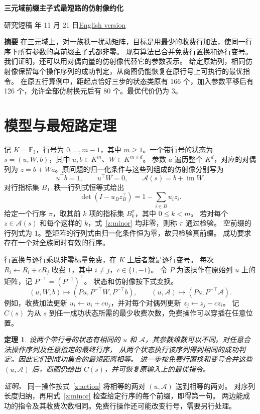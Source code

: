 \documentclass[UTF8,a4paper,11pt,scheme=plain]{ctexart}
\theoremstyle{zh}
\newtheorem{zhthm}{定理}
\theoremstyle{plain}
\newcommand{\F}{\mathbb F_3}
\newcommand{\A}{\mathcal A}
\newcommand{\im}{\operatorname{im}}
\newcommand{\stateeq}{u^\top b=1,\qquad u^\top W=0,\qquad \A(s)=b+\im W.}
\newcommand{\minoreq}{\det (I-u_B z_B^\top)=1-\sum_{i\in B}u_i z_i.}
\newcommand{\actioneq}{(u,W,b)\longmapsto(Pu,P^{-\top}W,P^{-\top}b),\qquad
       (u,\A)\longmapsto(Pu,P^{-\top}\A).}
\begin{document}
\fontsize{12}{16.5}\selectfont
\renewcommand{\proofname}{证明}
\renewcommand{\refname}{参考文献}
\begin{center}
  {\sffamily\bfseries\fontsize{20}{26}\selectfont 三元域前缀主子式最短路的仿射像约化\par}
  \vspace{.5em}
  {\small 研究短稿 年 11 月 21 日\qquad\hyperlink{edition-en.0}{English version}}
\end{center}
\noindent\textbf{摘要}\quad
在三元域上，对一族秩一扰动矩阵，目标是用最少的收费行加法，使同一行序下所有参数的真前缀主子式都非零。
现有算法已合并免费行置换和逐行变号。我们证明，还可以用对偶向量的仿射像代替它的参数表示。
给定原始列，相同仿射像保留每个操作序列的成功判定，从商图仍能恢复在原行号上可执行的最优指令。
在原五行算例中，距起点恰好三步的状态类原有 166 个，加入参数平移后有 126 个，允许全部仿射换元后有 80 个。最优代价仍为 3。

\section{模型与最短路定理}
记 $K=\F$，行号为 $0,\ldots,m-1$，其中 $m\ge1$。一个带行号的状态为
$s=(u,W,b)$，其中 $u,b\in K^m$、$W\in K^{m\times d}$。
参数 $a$ 遍历整个 $K^d$，对应的对偶列为 $z=b+Wa$。原问题的归一化条件与这些列组成的仿射像分别写为
\begin{equation}\label{z:state}\stateeq\end{equation}
对行指标集 $B$，秩一行列式恒等式给出
\begin{equation}\label{z:minor}\minoreq\end{equation}
给定一个行序 $\pi$，取其前 $k$ 项的指标集 $B_k^\pi$，其中 $0\le k<m$。
若对每个 $z\in\A(s)$ 和每个这样的 $k$，式~\eqref{z:minor} 均非零，则称 $\pi$ 通过检验。
空前缀的行列式为 $1$。整矩阵的行列式由归一化条件恒为零，故只检验真前缀。
成功要求存在一个对全族同时有效的行序。

行置换与逐行乘以非零标量免费，在 $K$ 上后者就是逐行变号。
每次 $R_i\gets R_i+cR_j$ 收费 $1$，其中 $i\ne j$，$c\in\{1,-1\}$。
令 $P$ 为该操作在原始列 $u$ 上的矩阵，记 $P^{-\top}=(P^{-1})^\top$。
状态和仿射像按下式变换。
\begin{equation}\label{z:action}\actioneq\end{equation}
例如，收费加法更新 $u_i\gets u_i+cu_j$，并对每个对偶列更新 $z_j\gets z_j-cz_i$。
记 $C(s)$ 为从 $s$ 到任一成功状态所需的最少收费次数，免费操作可以穿插在任意位置。

\begin{zhthm}\label{z:main}
设两个带行号的状态有相同的 $u$ 和 $\A$，其参数维数可以不同。对任意合法操作序列及任意指定的最终行序，
从两个状态执行该序列得到相同的成功判定。因此它们到成功集合的最短距离相等。
进一步按免费行置换和变号合并这些 $(u,\A)$ 后，商图仍给出 $C(s)$，并可恢复原输入上的最优指令。
\end{zhthm}
\noindent\emph{证明。}\enspace
同一操作按式~\eqref{z:action} 将相等的两对 $(u,\A)$ 送到相等的两对。
对序列长度归纳，再用式~\eqref{z:minor} 检查给定行序的每个前缀，即得第一句。
两边能成功的指令及其收费次数相同。免费行操作还可能改变行号，需要另行处理。
\end{document}
